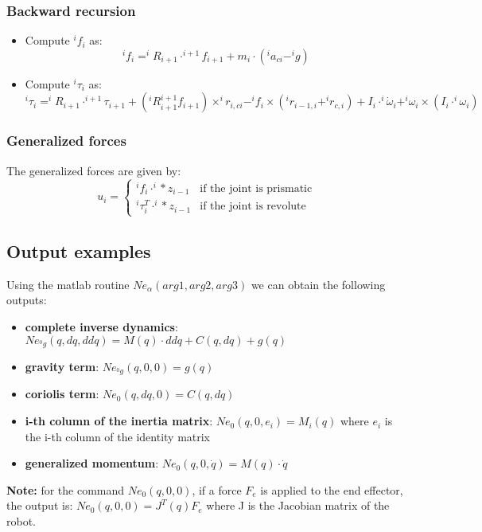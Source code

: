 \documentclass[a4paper,12pt]{article}
\begin{document}
\subsubsection{Backward recursion}
\begin{itemize}
    \item Compute $^i f_i$ as: \begin{equation}
        ^i f_i = ^iR_{i+1} \cdot ^{i+1}f_{i+1} + m_i \cdot (^i a_{ci} - ^ig)
    \end{equation}
    \item Compute $^i \tau_i$ as: \begin{equation}
        ^i \tau_i = ^iR_{i+1} \cdot ^{i+1}\tau_{i+1} + (^iR_{i+1}^{i+1}f_{i+1}) \times ^ir_{i,ci} -^if_i \times (^ir_{i-1,i}+^ir_{c,i})+I_i \cdot ^i\dot{\omega}_i + ^i\omega_i \times (I_i \cdot ^i\omega_i)
    \end{equation}
\end{itemize}
\subsubsection{Generalized forces}
The generalized forces are given by:
\begin{equation}
    u_i = \begin{cases}
        ^if_i\cdot ^i*z_{i-1} & \text{if the joint is prismatic} \\
        ^i\tau_i^T\cdot ^i*z_{i-1} & \text{if the joint is revolute}
    \end{cases}
\end{equation}
\subsection{Output examples}
Using the matlab routine $Ne_\alpha(arg1,arg2,arg3)$ we can obtain 
the following outputs:
\begin{itemize}
    \item  \textbf{complete inverse dynamics}: $Ne_{^0g}(q,dq,ddq)= M(q) \cdot ddq + C(q,dq) + g(q)$
    \item \textbf{gravity term}: $Ne_{^0g}(q,0,0) = g(q)$
    \item \textbf{coriolis term}: $Ne_{0}(q,dq,0) = C(q,dq)$
    \item \textbf{i-th column of the inertia matrix}: $Ne_{0}(q,0,e_i) = M_i(q)$ where $e_i$
     is the i-th column of the identity matrix
    \item \textbf{generalized momentum}: $Ne_{0}(q,0,\dot{q}) = M(q) \cdot \dot{q}$
\end{itemize}
\textbf{Note:} for the command $Ne_{0}(q,0,0)$, if a force $F_e$
is applied to the end effector, the output is: $Ne_{0}(q,0,0) = J^T(q)F_e$
where J is the Jacobian matrix of the robot.
\end{document}
